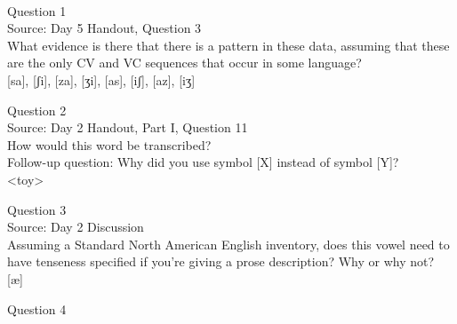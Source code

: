 \documentclass[12pt]{article}
\begin{document}
\newpage

\begin{center}
\textbf{{\color{red}{\HUGE END OF EXAM}}}\\

\end{center}
\newpage

\begin{center}
\textbf{{\color{blue}{\HUGE START OF EXAM\\}}}

\textbf{{\color{blue}{\HUGE Student ID: 1743\\}}}

\textbf{{\color{blue}{\HUGE 1:15 - 1:30 PM\\}}}

\end{center}
\newpage

{\large Question 1}\\

Source: Day 5 Handout, Question 3\\

What evidence is there that there is a pattern in these data, assuming that these are the only CV and VC sequences that occur in some language?\\

{[sa]}, {[ʃi]}, {[za]}, {[ʒi]}, {[as]}, {[iʃ]}, {[az]}, {[iʒ]}


\newpage

{\large Question 2}\\

Source: Day 2 Handout, Part I, Question 11\\

How would this word be transcribed?\\ Follow-up question: Why did you use symbol [X] instead of symbol [Y]?\\

<toy>


\newpage

{\large Question 3}\\

Source: Day 2 Discussion\\

Assuming a Standard North American English inventory, does this vowel need to have tenseness specified if you're giving a prose description? Why or why not?\\

{[æ]}


\newpage

{\large Question 4}\\
\end{document}
